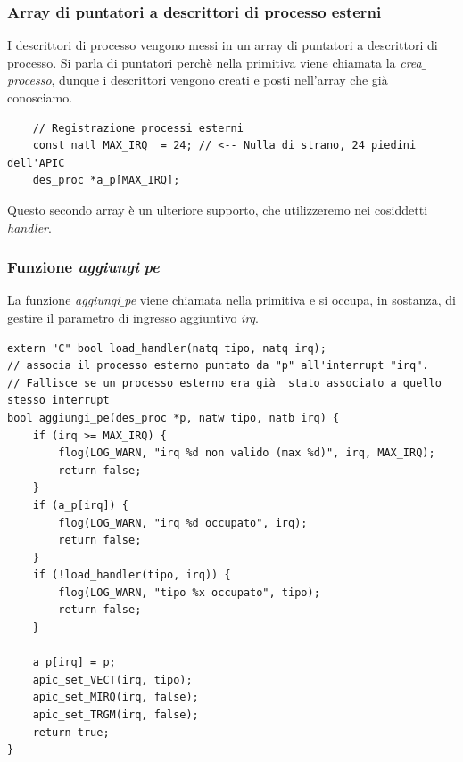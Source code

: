 \documentclass[11pt]{report}
\theoremstyle{definition}
\begin{document}
\subsubsection{Array di puntatori a descrittori di processo esterni}
I descrittori di processo vengono messi in un array di puntatori a descrittori di processo. Si parla di puntatori perchè nella primitiva viene chiamata la \emph{crea$\_$processo}, dunque i descrittori vengono creati e posti nell'array che già conosciamo. 
\begin{verbatim}
	// Registrazione processi esterni
	const natl MAX_IRQ  = 24; // <-- Nulla di strano, 24 piedini dell'APIC	
	des_proc *a_p[MAX_IRQ];
\end{verbatim}Questo secondo array è un ulteriore supporto, che utilizzeremo nei cosiddetti \emph{handler}.
\subsubsection{Funzione \emph{aggiungi$\_$pe}}
La funzione \emph{aggiungi$\_$pe} viene chiamata nella primitiva e si occupa, in sostanza, di gestire il parametro di ingresso aggiuntivo \emph{irq}.
\small
\begin{verbatim}
extern "C" bool load_handler(natq tipo, natq irq);
// associa il processo esterno puntato da "p" all'interrupt "irq".
// Fallisce se un processo esterno era già  stato associato a quello stesso interrupt
bool aggiungi_pe(des_proc *p, natw tipo, natb irq) {
    if (irq >= MAX_IRQ) {
        flog(LOG_WARN, "irq %d non valido (max %d)", irq, MAX_IRQ);
        return false;
    }
    if (a_p[irq]) {
        flog(LOG_WARN, "irq %d occupato", irq);
        return false;
    }
    if (!load_handler(tipo, irq)) {
        flog(LOG_WARN, "tipo %x occupato", tipo);
        return false;
    }
		
    a_p[irq] = p;
    apic_set_VECT(irq, tipo);
    apic_set_MIRQ(irq, false);
    apic_set_TRGM(irq, false);
    return true;
}
\end{verbatim}
\normalsize 
\end{document}
